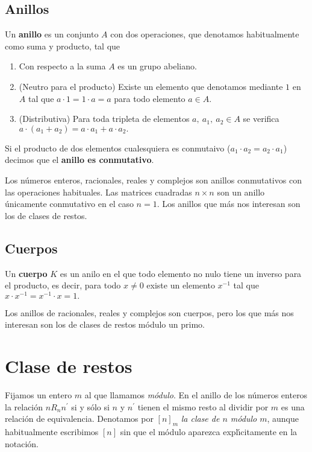 \subsection{Anillos}

Un {\bf anillo} es un conjunto $A$ con dos operaciones, que denotamos habitualmente como suma y producto, tal que 
\begin{enumerate}
	\item Con respecto a la suma $A$ es un grupo abeliano.
	\item (Neutro para el producto) Existe un elemento que denotamos mediante $1$ en $A$ tal que  $a\cdot 1=1\cdot a=a$ para todo elemento $a\in A.$
	\item (Distributiva) Para toda tripleta de elementos $a,\ a_1,\ a_2 \in A$ se verifica $a\cdot (a_1+a_2)=a\cdot a_1+a\cdot a_2.$
	\end{enumerate}

Si el producto de dos elementos cualesquiera es conmutaivo ($a_1\cdot a_2=a_2\cdot a_1$) decimos que el {\bf anillo es conmutativo}.

Los n\'umeros enteros, racionales, reales y complejos son anillos conmutativos con las operaciones habituales. Las matrices cuadradas $n\times n$ son un anillo \'unicamente conmutativo en el caso $n=1$. Los anillos que m\'as nos interesan son los de clases de restos. 

\subsection{Cuerpos}

Un {\bf cuerpo} $K$  es un anilo en el que todo elemento no nulo tiene un inverso para el producto, es decir, para todo $x\ne 0$ existe un elemento $x^{-1}$ tal que $x\cdot x^{-1}=x^{-1}\cdot x=1.$ 

Los anillos  de racionales, reales y complejos son cuerpos, pero los que m\'as nos interesan son los de clases de restos m\'odulo un primo. 




\section{Clase de restos}

Fijamos un entero $m$ al que llamamos {\itshape m\'odulo}. 
En el anillo de los n\'umeros enteros la relaci\'on  $nR_{n}n^\prime 
$ si  y s\'olo si   $n$ y $n^\prime$ tienen el mismo resto al 
dividir por $m$ es una relaci\'on de equivalencia. Denotamos por $[ 
n]_m$ {\itshape la clase de $n$ m\'odulo $m$},  aunque habitualmente  escribimos
$[n]$
sin que el m\'odulo aparezca expl\'{\i}citamente en la notaci\'on.



